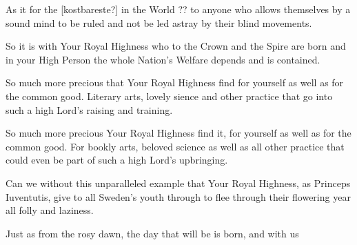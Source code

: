 
\newpage




As it for the [kostbareste?] in the World ?? to anyone who allows themselves by a
sound mind to be ruled and not be led astray by their blind
movements. 

So it is with Your Royal Highness who to the Crown and the
Spire are born and in your High Person the whole Nation's Welfare
depends and is contained. 

So much more precious that Your Royal
Highness find for yourself as well as for the common good. Literary
arts, lovely sience and other practice that go into such a high Lord's 
raising and training. 

So much more precious Your Royal Highness find
it,  for yourself as well as for the common good. For bookly arts,
beloved science as well as all other practice that could even be part of
such a high Lord's upbringing.

Can we without this unparalleled example that Your Royal Highness, as
Princeps Iuventutis, give to all Sweden's youth through to flee
through their flowering year all folly and laziness. 

Just as from the rosy dawn, the day that will be is born, and with us 